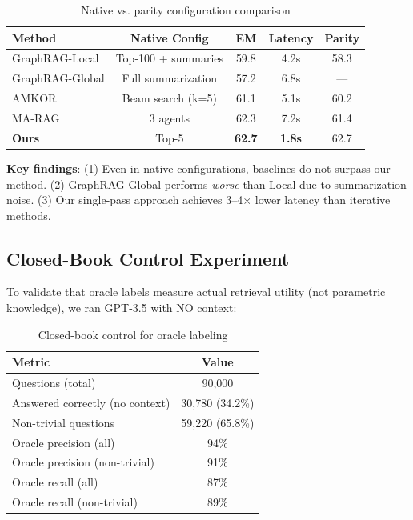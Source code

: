 \documentclass[10pt,twocolumn]{article}
\begin{document}
\begin{table}[t]
\centering
\caption{Native vs. parity configuration comparison}
\label{tab:native_config}
\small
\begin{tabular}{@{}lcccc@{}}
\toprule
\textbf{Method} & \textbf{Native Config} & \textbf{EM} & \textbf{Latency} & \textbf{Parity} \\
\midrule
GraphRAG-Local & Top-100 + summaries & 59.8 & 4.2s & 58.3 \\
GraphRAG-Global & Full summarization & 57.2 & 6.8s & --- \\
AMKOR & Beam search (k=5) & 61.1 & 5.1s & 60.2 \\
MA-RAG & 3 agents & 62.3 & 7.2s & 61.4 \\
\midrule
\textbf{Ours} & Top-5 & \textbf{62.7} & \textbf{1.8s} & 62.7 \\
\bottomrule
\end{tabular}
\end{table}

\textbf{Key findings}: (1) Even in native configurations, baselines do not surpass our method. (2) GraphRAG-Global performs \textit{worse} than Local due to summarization noise. (3) Our single-pass approach achieves 3--4$\times$ lower latency than iterative methods.


\subsection{Closed-Book Control Experiment}
\label{sec:closedbook}

To validate that oracle labels measure actual retrieval utility (not parametric knowledge), we ran GPT-3.5 with NO context:

\begin{table}[h]
\centering
\caption{Closed-book control for oracle labeling}
\label{tab:closedbook}
\small
\begin{tabular}{@{}lc@{}}
\toprule
\textbf{Metric} & \textbf{Value} \\
\midrule
Questions (total) & 90,000 \\
Answered correctly (no context) & 30,780 (34.2\%) \\
Non-trivial questions & 59,220 (65.8\%) \\
\midrule
Oracle precision (all) & 94\% \\
Oracle precision (non-trivial) & 91\% \\
Oracle recall (all) & 87\% \\
Oracle recall (non-trivial) & 89\% \\
\bottomrule
\end{tabular}
\end{table}
\end{document}
